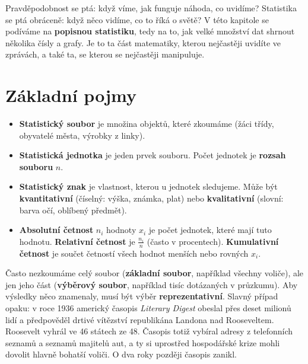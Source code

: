 \label{kap:statistika}

Pravděpodobnost se ptá: když víme, jak funguje náhoda, co uvidíme? Statistika se ptá obráceně: když něco vidíme, co to říká o světě? V této kapitole se podíváme na \textbf{popisnou statistiku}, tedy na to, jak velké množství dat shrnout několika čísly a grafy. Je to ta část matematiky, kterou nejčastěji uvidíte ve zprávách, a také ta, se kterou se nejčastěji manipuluje.

\section{Základní pojmy}\label{sec:stat-zakladni-pojmy}

\begin{definitionbox}
  \begin{itemize}
    \item \textbf{Statistický soubor} je množina objektů, které zkoumáme (žáci třídy, obyvatelé města, výrobky z linky).
    \item \textbf{Statistická jednotka} je jeden prvek souboru. Počet jednotek je \textbf{rozsah souboru} $n$.
    \item \textbf{Statistický znak} je vlastnost, kterou u jednotek sledujeme. Může být \textbf{kvantitativní} (číselný: výška, známka, plat) nebo \textbf{kvalitativní} (slovní: barva očí, oblíbený předmět).
    \item \textbf{Absolutní četnost} $n_i$ hodnoty $x_i$ je počet jednotek, které mají tuto hodnotu. \textbf{Relativní četnost} je $\frac{n_i}{n}$ (často v procentech). \textbf{Kumulativní četnost} je součet četností všech hodnot menších nebo rovných $x_i$.
  \end{itemize}
\end{definitionbox}

Často nezkoumáme celý soubor (\textbf{základní soubor}, například všechny voliče), ale jen jeho část (\textbf{výběrový soubor}, například tisíc dotázaných v průzkumu). Aby výsledky něco znamenaly, musí být výběr \textbf{reprezentativní}. Slavný případ opaku: v roce 1936 americký časopis \textit{Literary Digest} obeslal přes deset milionů lidí a předpověděl drtivé vítězství republikána Landona nad Rooseveltem. Roosevelt vyhrál ve 46 státech ze 48. Časopis totiž vybíral adresy z telefonních seznamů a seznamů majitelů aut, a ty si uprostřed hospodářské krize mohli dovolit hlavně bohatší voliči. O dva roky později časopis zanikl.

